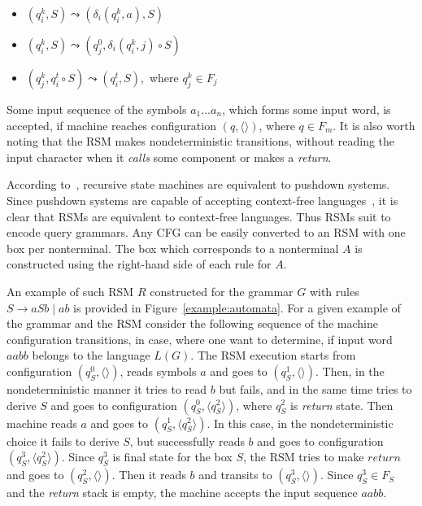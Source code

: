 \begin{itemize}
    \item $(q_i^k,S) \leadsto (\delta_i (q_i^k, a),S)$
    \item $(q_i^k,S) \leadsto (q_j^0, \delta_i (q_i^k, j) \circ S)$
    \item $(q_j^k,q_i^t\circ S) \leadsto (q_i^t, S),$ where $q_j^k \in F_j$ 
\end{itemize}

Some input sequence of the symbols $a_1 ... a_n$, which forms some input word, is accepted, if machine reaches configuration $(q,\langle\rangle)$, where $q \in F_m$. It is also worth noting that the  RSM makes nondeterministic transitions, without reading the input character when it \textit{calls} some component or  makes a \textit{return}.

According to~\cite{rsm:analysis:10.1007/3-540-44585-4_18}, recursive state machines are equivalent to pushdown systems.
Since pushdown systems are capable of accepting context-free languages~\cite{automata:theory:10.5555/1177300}, it is clear that RSMs are equivalent to context-free languages.
Thus RSMs suit to encode query grammars.
Any CFG can be easily converted to an RSM with one box per nonterminal.
The box which corresponds to a nonterminal $A$ is constructed using the right-hand side of each rule for $A$.

An example of such RSM $R$ constructed for the grammar $G$ with rules $S \to a S b \mid a b$ is provided in Figure~\ref{example:automata}. 
For a given example of the grammar and the RSM consider the following sequence of the machine configuration transitions, in case, where one want to determine, if input word $aabb$ belongs to the language $L(G)$. 
The RSM execution starts from configuration $(q_S^0,\langle \rangle)$, reads symbols $a$ and goes to $(q_S^1, \langle \rangle)$. 
Then, in the nondeterministic manner it tries to read $b$ but fails, and in the same time tries to derive $S$ and goes to configuration $(q_S^0, \langle q_S^2 \rangle)$, where $q_S^2$ is \textit{return} state. 
Then machine reads $a$ and goes to $(q_S^1, \langle q_S^2 \rangle)$. In this case, in the nondeterministic choice it fails to derive $S$, but successfully reads $b$ and goes to configuration $(q_S^3,\langle q_S^2 \rangle)$. 
Since $q_S^3$ is final state for the box $S$, the RSM tries to make $return$ and goes to $(q_S^2,\langle \rangle)$. 
Then it reads $b$ and transits to $(q_S^3,\langle \rangle)$. 
Since $q_S^3 \in F_S$ and the \textit{return} stack is empty, the machine accepts the input sequence $aabb$.

